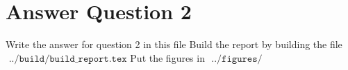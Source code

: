 

\section{Answer Question 2}

Write the answer for question 2 in this file
\newline
\newline
Build the report by building the file $\texttt{ ../build/build\_report.tex}$
\newline
\newline
Put the figures in $\texttt{ ../figures/ }$